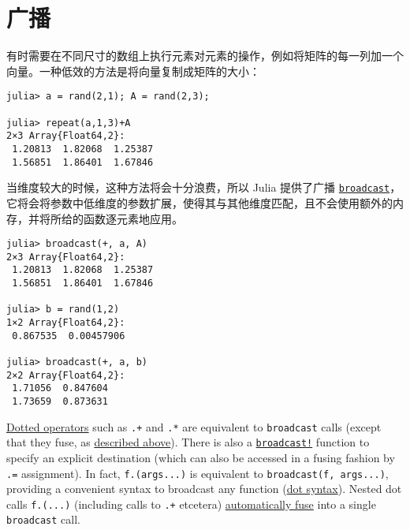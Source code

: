 \hypertarget{7321350919619265679}{}


\section{广播}



有时需要在不同尺寸的数组上执行元素对元素的操作，例如将矩阵的每一列加一个向量。一种低效的方法是将向量复制成矩阵的大小：




\begin{verbatim}
julia> a = rand(2,1); A = rand(2,3);

julia> repeat(a,1,3)+A
2×3 Array{Float64,2}:
 1.20813  1.82068  1.25387
 1.56851  1.86401  1.67846
\end{verbatim}



当维度较大的时候，这种方法将会十分浪费，所以 Julia 提供了广播 \hyperlink{616124539803111168}{\texttt{broadcast}}，它将会将参数中低维度的参数扩展，使得其与其他维度匹配，且不会使用额外的内存，并将所给的函数逐元素地应用。




\begin{verbatim}
julia> broadcast(+, a, A)
2×3 Array{Float64,2}:
 1.20813  1.82068  1.25387
 1.56851  1.86401  1.67846

julia> b = rand(1,2)
1×2 Array{Float64,2}:
 0.867535  0.00457906

julia> broadcast(+, a, b)
2×2 Array{Float64,2}:
 1.71056  0.847604
 1.73659  0.873631
\end{verbatim}



\hyperlink{15967322336376951940}{Dotted operators} such as \texttt{.+} and \texttt{.*} are equivalent to \texttt{broadcast} calls (except that they fuse, as \hyperlink{4802910107640435151}{described above}). There is also a \hyperlink{7631985657411687574}{\texttt{broadcast!}} function to specify an explicit destination (which can also be accessed in a fusing fashion by \texttt{.=} assignment). In fact, \texttt{f.(args...)} is equivalent to \texttt{broadcast(f, args...)}, providing a convenient syntax to broadcast any function (\hyperlink{17801130558550430478}{dot syntax}). Nested {\textquotedbl}dot calls{\textquotedbl} \texttt{f.(...)} (including calls to \texttt{.+} etcetera) \hyperlink{15967322336376951940}{automatically fuse} into a single \texttt{broadcast} call.



